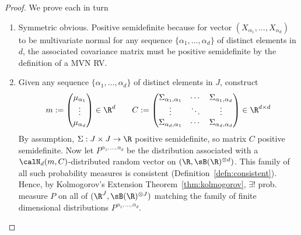 \documentclass[12pt]{article}
\theoremstyle{plain}
\theoremstyle{definition}
\theoremstyle{remark}
\newcommand{\ra}{\rightarrow}
\begin{document}
\begin{proof}
We prove each in turn
\begin{enumerate}[label=(\roman*)]
  \item Symmetric obvious.
    Positive semidefinite because for vector $(X_{\alpha_1},\ldots,X_{\alpha_d})$
    to be multivariate normal for any sequence
    $\{\alpha_1,\ldots,\alpha_d\}$ of distinct elements in $d$, the associated
    covariance matrix must be positive semidefinite by the definition of
    a MVN RV.
  \item
    Given any sequence $\{\alpha_1,\ldots,\alpha_d\}$ of distinct
    elements in $J$, construct
    \begin{align*}
      m:=
      \begin{pmatrix}
        \mu_{\alpha_1} \\ \vdots \\ \mu_{\alpha_d}
      \end{pmatrix}
      \in \R^d
      \qquad
      C:=
      \begin{pmatrix}
        \Sigma_{\alpha_1,\alpha_1} & \cdots & \Sigma_{\alpha_1,\alpha_d}
        \\
        \vdots & \ddots &\vdots \\
        \Sigma_{\alpha_d,\alpha_1} & \cdots & \Sigma_{\alpha_d,\alpha_d}
      \end{pmatrix}
      \in\R^{d\times d}
    \end{align*}
    By assumption, $\Sigma:J\times J\ra\R$ positive semidefinite, so
    matrix $C$ positive semidefinite.
    Now let $P^{\alpha_1,\ldots,\alpha_d}$ be the distribution
    associated with a $\calN_d(m,C)$-distributed random vector on
    $(\R,\sB(\R)^{\otimes d})$.
    This family of all such probability measures is consistent
    (Definition~\ref{defn:consistent}).
    Hence, by Kolmogorov's Extension Theorem~\ref{thm:kolmogorov},
    $\exists !$ prob. measure $P$ on all of
    $(\R^J,\sB(\R)^{\otimes J})$
    matching the family of finite dimensional distributions
    $P^{\alpha_1,\ldots,\alpha_d}$.
\end{enumerate}
\end{proof}
\end{document}
